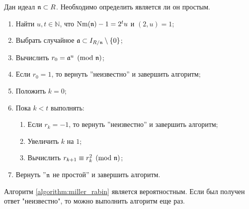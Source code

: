\documentclass[_00_dissertation.tex]{subfiles}
\begin{document}
\begin{algorithm}\label{algorithm:miller_rabin}
    Дан идеал $\mathfrak{n} \subset R$.
    Необходимо определить является ли он простым.

    \begin{enumerate}
        \item Найти $u, t \in \mathbb{N}$, что $\textrm{Nm}(\mathfrak{n}) - 1 = 2^t u$ и $(2, u) = 1$;
        
        \item Выбрать случайное $\mathfrak{a} \subset I_{R/\mathfrak{n}}\setminus\{0\}$;

        \item Вычислить $r_0 = \mathfrak{a}^u \pmod{\mathfrak{n}}$;

        \item Если $r_0 = 1$, то вернуть ''неизвестно'' и завершить алгоритм;

        \item Положить $k = 0$;

        \item Пока $k < t$ выполнять:
        \begin{enumerate}
            \item Если $r_k = -1$, то вернуть ''неизвестно'' и завершить алгоритм;

            \item Увеличить $k$ на $1$;

            \item Вычислить $r_{k+1} \equiv r_k^2 \pmod{\mathfrak{n}}$;
        \end{enumerate}

        \item Вернуть ''$\mathfrak{n}$ не простой'' и завершить алгоритм.
    \end{enumerate}
\end{algorithm}

\begin{remark}
    Алгоритм \ref{algorithm:miller_rabin} является вероятностным.
    Если был получен ответ "неизвестно", то можно выполнить алгоритм еще раз.
\end{remark}
\end{document}
